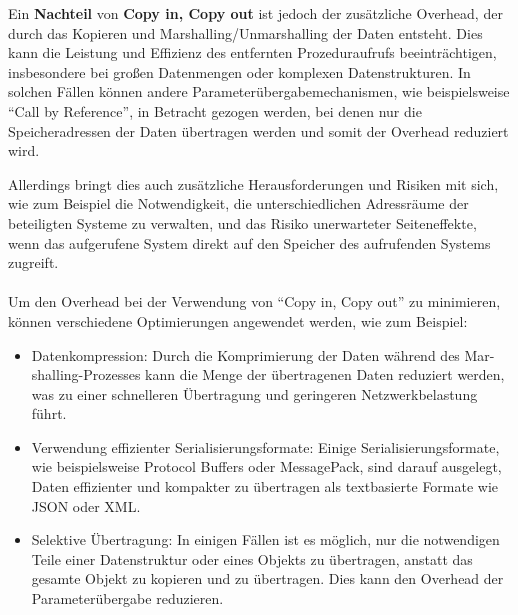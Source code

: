 \documentclass[../vs-script-first-v01.tex]{subfiles}
\begin{document}
Ein \textbf{Nachteil} von \textbf{Copy in, Copy out} ist jedoch der zusätzliche Overhead, der durch das Kopieren und Marshalling/Unmarshalling der Daten entsteht. Dies kann die Leistung und Effizienz des entfernten Prozeduraufrufs beeinträchtigen, insbesondere bei großen Datenmengen oder komplexen Datenstrukturen. In solchen Fällen können andere Parameterübergabemechanismen, wie beispielsweise \enquote{Call by Reference}, in Betracht gezogen werden, bei denen nur die Speicheradressen der Daten übertragen werden und somit der Overhead reduziert wird. 

Allerdings bringt dies auch zusätzliche Herausforderungen und Risiken mit sich, wie zum Beispiel die Notwendigkeit, die unterschiedlichen Adressräume der beteiligten Systeme zu verwalten, und das Risiko unerwarteter Seiteneffekte, wenn das aufgerufene System direkt auf den Speicher des aufrufenden Systems zugreift.
\\\\
Um den Overhead bei der Verwendung von \enquote{Copy in, Copy out} zu minimieren, können verschiedene Optimierungen angewendet werden, wie zum Beispiel:

\begin{itemize} 
\item Datenkompression: Durch die Komprimierung der Daten während des Mar-shalling-Prozesses kann die Menge der übertragenen Daten reduziert werden, was zu einer schnelleren Übertragung und geringeren Netzwerkbelastung führt.
\item Verwendung effizienter Serialisierungsformate: Einige Serialisierungsformate, wie beispielsweise Protocol Buffers oder MessagePack, sind darauf ausgelegt, Daten effizienter und kompakter zu übertragen als textbasierte Formate wie JSON oder XML.
\item Selektive Übertragung: In einigen Fällen ist es möglich, nur die notwendigen Teile einer Datenstruktur oder eines Objekts zu übertragen, anstatt das gesamte Objekt zu kopieren und zu übertragen. Dies kann den Overhead der Parameterübergabe reduzieren.
\end{itemize} 
\end{document}

